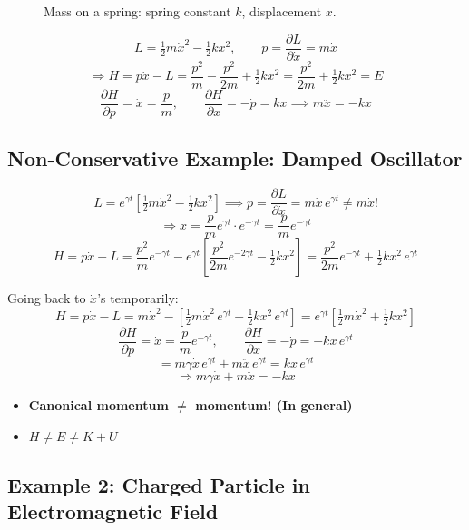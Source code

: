 \begin{figure}[H]
    \centering
    \caption{Mass on a spring: spring constant $k$, displacement $x$.}
\end{figure}

\[
    L = \tfrac{1}{2}m\dot{x}^2 - \tfrac{1}{2}kx^2, \qquad p = \frac{\partial L}{\partial \dot{x}} = m\dot{x}
\]
\[
    \Rightarrow H = p\dot{x} - L = \frac{p^2}{m} - \frac{p^2}{2m} + \tfrac{1}{2}kx^2 = \frac{p^2}{2m} + \tfrac{1}{2}kx^2 = E
\]
\[
    \frac{\partial H}{\partial p} = \dot{x} = \frac{p}{m}, \qquad \frac{\partial H}{\partial x} = -\dot{p} = kx \implies \boxed{m\ddot{x} = -kx}
\]

\subsection*{Non-Conservative Example: Damped Oscillator}

\[
    L = e^{\gamma t}\!\left[\tfrac{1}{2}m\dot{x}^2 - \tfrac{1}{2}kx^2\right] \implies p = \frac{\partial L}{\partial \dot{x}} = m\dot{x}\,e^{\gamma t} \neq m\dot{x}!
\]
\[
    \Rightarrow \dot{x} = \frac{p}{m}e^{\gamma t} \cdot e^{-\gamma t} = \frac{p}{m}e^{-\gamma t}
\]
\[
    H = p\dot{x} - L = \frac{p^2}{m}e^{-\gamma t} - e^{\gamma t}\!\left[\frac{p^2}{2m}e^{-2\gamma t} - \tfrac{1}{2}kx^2\right]
    = \frac{p^2}{2m}e^{-\gamma t} + \tfrac{1}{2}kx^2\,e^{\gamma t}
\]

Going back to $\dot{x}$'s temporarily:
\[
    H = p\dot{x} - L = m\dot{x}^2 - \left[\tfrac{1}{2}m\dot{x}^2\,e^{\gamma t} - \tfrac{1}{2}kx^2\,e^{\gamma t}\right] = e^{\gamma t}\!\left[\tfrac{1}{2}m\dot{x}^2 + \tfrac{1}{2}kx^2\right]
\]
\[
    \frac{\partial H}{\partial p} = \dot{x} = \frac{p}{m}e^{-\gamma t}, \qquad \frac{\partial H}{\partial x} = -\dot{p} = -kx\,e^{\gamma t}
\]
\[
    = m\gamma\dot{x}\,e^{\gamma t} + m\ddot{x}\,e^{\gamma t} = kx\,e^{\gamma t}
\]
\[
    \Rightarrow m\gamma\dot{x} + m\ddot{x} = -kx
\]

\begin{itemize}
    \item \textbf{Canonical momentum $\neq$ momentum! (In general)}
    \item $H \neq E \neq K + U$
\end{itemize}

\subsection*{Example 2: Charged Particle in Electromagnetic Field}

